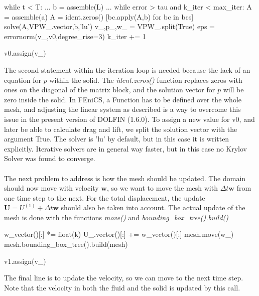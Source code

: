 \begin{cverbatim}
while t < T:
	...
	b = assemble(L)
	...
	while error > tau and k_iter < max_iter:
		A = assemble(a)
		A = ident.zeros()
		[bc.apply(A,b) for bc in bcs]
		solve(A,VPW_.vector,b,'lu')
		v_,p_,w_ = VPW_.split(True)
		eps = errornorm(v_,v0,degree_rise=3)	
		k_iter += 1
		
		v0.assign(v_)
\end{cverbatim}
The second statement within the iteration loop is needed because the lack of an equation for $p$ within the solid. The \textit{ident.zeros()} function replaces zeros with ones on the diagonal of the matrix block, and the solution vector for $p$ will be zero inside the solid. In FEniCS, a Function has to be defined over the whole mesh, and adjusting the linear system as described is a way to overcome this issue in the present version of DOLFIN (1.6.0). To assign a new value for v0, and later be able to calculate drag and lift, we split the solution vector with the argument True. The solver is 'lu' by default, but in this case it is written explicitly. Iterative solvers are in general way faster, but in this case no Krylov Solver was found to converge. 
\\
\\
The next problem to address is how the mesh should be updated. The domain should now move with velocity $\mathbf{w}$, so we want to move the mesh with $\Delta t \mathbf{w}$ from one time step to the next. For the total displacement, the update $\mathbf{U} = U^{(1)} + \Delta t \mathbf{w}$ should also be taken into account. The actual update of the mesh is done with the functions \textit{move()} and \textit{bounding\_box\_tree().build()}
\begin{cverbatim}
	w_vector()[:] *= float(k)
	U_.vector()[:] += w_vector()[:]
	mesh.move(w_)
	mesh.bounding_box_tree().build(mesh)
	
	v1.assign(v_)
\end{cverbatim}
The final line is to update the velocity, so we can move to the next time step. Note that the velocity in both the fluid and the solid is updated by this call. \\

	
	
	


